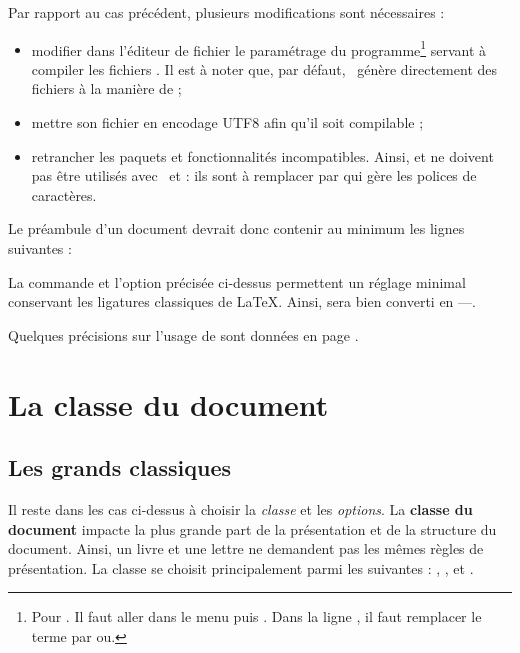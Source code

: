 Par rapport au cas précédent, plusieurs modifications sont nécessaires : 
\begin{itemize}
\item modifier dans l'éditeur de fichier  le paramétrage du programme\footnote{Pour . Il faut aller dans le menu  puis . Dans la ligne , il faut remplacer le terme  par  ou.} servant à compiler les fichiers . Il est à noter que, par défaut, \XeLaTeX\ génère directement des fichiers  à la manière de  ;
\item mettre son fichier en encodage UTF8 afin qu'il soit compilable ;
\item retrancher les paquets et fonctionnalités incompatibles. Ainsi,  et  ne doivent pas être utilisés avec \XeLaTeX\ et \LuaLaTeX: ils sont à remplacer par  qui gère les polices de caractères. \\
\end{itemize}

Le préambule d'un document devrait donc contenir au minimum les lignes suivantes : 


La commande  et l'option précisée ci-dessus permettent un réglage minimal conservant les ligatures classiques de \LaTeX. Ainsi, \macron{-{}-{}-} sera bien converti en ---. 

Quelques précisions sur l'usage de \XeLaTeX sont données en page \pageref{xelatex}.

\section{La classe du document}

\subsection{Les grands classiques}

Il reste dans les cas ci-dessus à choisir la \emph{classe} et les \emph{options}. La \textbf{classe du document} impacte la plus grande part de la présentation et de la structure du document. Ainsi, un livre et une lettre ne demandent pas les mêmes règles de présentation. La classe se choisit principalement parmi les suivantes : , ,  et . 

